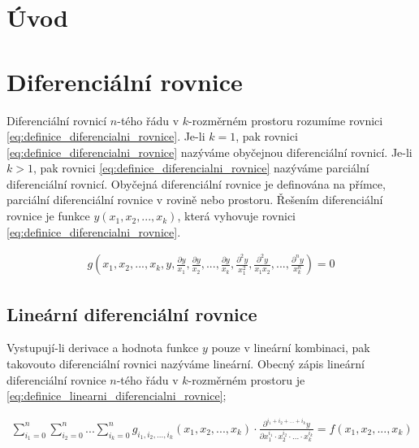 \documentclass{book}
\begin{document}
\chapter{Úvod}

\chapter{Diferenciální rovnice}

Diferenciální rovnicí \(n\)-tého řádu v \(k\)-rozměrném prostoru rozumíme rovnici \eqref{eq:definice_diferencialni_rovnice}. Je-li \(k = 1\), pak rovnici
\eqref{eq:definice_diferencialni_rovnice} nazýváme obyčejnou diferenciální rovnicí. Je-li \(k > 1\), pak rovnici \eqref{eq:definice_diferencialni_rovnice}
nazýváme parciální diferenciální rovnicí. Obyčejná diferenciální rovnice je definována na přímce, parciální diferenciální rovnice v rovině nebo prostoru.
Řešením diferenciální rovnice je funkce \(y(x_1, x_2, ..., x_k)\), která vyhovuje rovnici \eqref{eq:definice_diferencialni_rovnice}.

\begin{equation}
\label{eq:definice_diferencialni_rovnice}
\begin{split}
g(x_1, x_2, ..., x_k, y, \frac{\partial y}{x_1}, \frac{\partial y}{x_2}, ..., \frac{\partial y}{x_k}, \frac{\partial^2 y}{x_1^2}, \frac{\partial^2 y}{x_1 x_2}, ..., \frac{\partial^n y}{x_k^n}) = 0
\end{split}
\end{equation}

\section{Lineární diferenciální rovnice}

Vystupují-li derivace a hodnota funkce \(y\) pouze v lineární kombinaci, pak takovouto diferenciální rovnici nazýváme lineární. Obecný zápis lineární
diferenciální rovnice \(n\)-tého řádu v \(k\)-rozměrném prostoru je \eqref{eq:definice_linearni_diferencialni_rovnice};

\begin{equation}
\label{eq:definice_linearni_diferencialni_rovnice}
\begin{split}
\sum_{i_1=0}^n \sum_{i_2=0}^n ... \sum_{i_k=0}^n g_{i_1, i_2, ..., i_k} (x_1, x_2, ..., x_k) \cdot \frac{\partial^{i_1 + i_2 + ... + i_k} y}{\partial x_1^{i_1} \cdot x_2^{i_2} \cdot ... \cdot x_k^{i_k}} = f(x_1, x_2, ..., x_k)
\end{split}
\end{equation}
\end{document}

